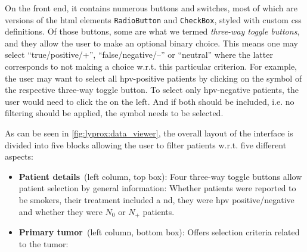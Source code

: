 \documentclass[\relativeRoot/main.tex]{subfiles}
\begin{document}
On the front end, it contains numerous buttons and switches, most of which are versions of the \acrshort{html} elements \texttt{RadioButton} and \texttt{CheckBox}, styled with custom \acrshort{css} definitions. Of those buttons, some are what we termed \emph{three-way toggle buttons}, and they allow the user to make an optional binary choice. This means one may select ``true/positive/+'', ``false/negative/--'' or ``neutral'' where the latter corresponds to not making a choice w.r.t. this particular criterion. For example, the user may want to select all \gls{hpv}-positive patients by clicking on the  symbol of the respective three-way toggle button. To select only \gls{hpv}-negative patients, the user would need to click the  on the left. And if both should be included, i.e. no filtering should be applied, the  symbol needs to be selected.

As can be seen in \cref{fig:lyprox:data_viewer}, the overall layout  of the interface is divided into five blocks allowing the user to filter patients w.r.t. five different aspects:

\begin{itemize}
    \item \textbf{Patient details}~(left column, top box): Four three-way toggle buttons allow patient selection by general information: Whether patients were reported to be smokers, their treatment included a \acrlong{nd}, they were \gls{hpv} positive/negative and whether they were $N_0$ or $N_+$ patients.
    \item \textbf{Primary tumor}~(left column, bottom box): Offers selection criteria related to the tumor: 
\end{itemize}
\end{document}
